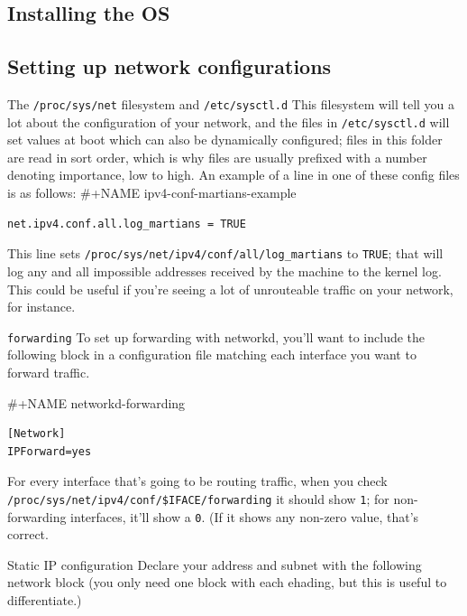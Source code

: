 \documentclass[bigger]{beamer}
\begin{document}
\subsection{Installing the OS}
\label{sec:org4390e2a}

\subsection{Setting up network configurations}
\label{sec:orgc20c062}

\begin{frame}[fragile,label={sec:org6f2d154}]{The \texttt{/proc/sys/net} filesystem and \texttt{/etc/sysctl.d}}
     This filesystem will tell you a lot about the configuration of your network,
    and the files in \texttt{/etc/sysctl.d} will set values at boot which can also be
    dynamically configured; files in this folder are read in sort order, which
    is why files are usually prefixed with a number denoting importance, low to
    high. An example of a line in one of these config files is as follows:
\#+NAME ipv4-conf-martians-example
\begin{verbatim}
net.ipv4.conf.all.log_martians = TRUE
\end{verbatim}

This line sets \texttt{/proc/sys/net/ipv4/conf/all/log\_martians} to \texttt{TRUE}; that will
log any and all impossible addresses received by the machine to the kernel
log. This could be useful if you're seeing a lot of unrouteable traffic on your
network, for instance.

\begin{block}{\texttt{forwarding}}
To set up forwarding with networkd, you'll want to include the following
block in a configuration file matching each interface you want to forward
traffic.

\#+NAME networkd-forwarding
\begin{verbatim}
[Network]
IPForward=yes
\end{verbatim}

For every interface that's going to be routing traffic, when you check
\texttt{/proc/sys/net/ipv4/conf/\$IFACE/forwarding} it should show \texttt{1}; for
non-forwarding interfaces, it'll show a \texttt{0}. (If it shows any non-zero
value, that's correct.
\end{block}

\begin{block}{Static IP configuration}
Declare your address and subnet with the following network block (you only
need one block with each ehading, but this is useful to differentiate.)


\end{block}
\end{frame}
\end{document}
